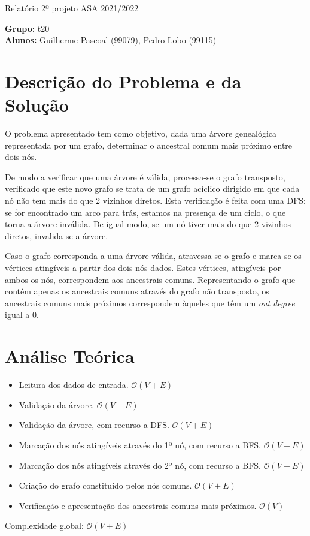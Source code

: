 \documentclass[12pt, letterpaper]{article}
\begin{document}
\begin{center}
	{\LARGE{Relatório 2º projeto ASA 2021/2022}}\\[\baselineskip]
\end{center}

\begin{flushleft}
	\textbf{Grupo:} t20\\
	\textbf{Alunos:} Guilherme Pascoal (99079), Pedro Lobo (99115)
\end{flushleft}


\section{Descrição do Problema e da Solução}

O problema apresentado tem como objetivo, dada uma árvore genealógica
representada por um grafo, determinar o ancestral comum mais próximo entre dois
nós.

De modo a verificar que uma árvore é válida, processa-se o grafo transposto,
verificado que este novo grafo se trata de um grafo acíclico dirigido em que cada
nó não tem mais do que 2 vizinhos diretos.
Esta verificação é feita com uma DFS: se for encontrado um arco para trás,
estamos na presença de um ciclo, o que torna a árvore inválida. De igual modo,
se um nó tiver mais do que 2 vizinhos diretos, invalida-se a árvore.

Caso o grafo corresponda a uma árvore válida, atravessa-se o grafo e marca-se os
vértices atingíveis a partir dos dois nós dados. Estes vértices, atingíveis por
ambos os nós, correspondem aos ancestrais comuns. Representando o grafo que
contém apenas os ancestrais comuns através do grafo não transposto, os
ancestrais comuns mais próximos correspondem àqueles que têm um
\emph{out degree} igual a 0.


\section{Análise Teórica}

\begin{itemize}
	\item Leitura dos dados de entrada. $\mathcal{O}(V + E)$
	\item Validação da árvore. $\mathcal{O}(V + E)$
	\item Validação da árvore, com recurso a DFS. $\mathcal{O}(V + E)$
	\item Marcação dos nós atingíveis através do 1º nó, com recurso a BFS. $\mathcal{O}(V + E)$
	\item Marcação dos nós atingíveis através do 2º nó, com recurso a BFS. $\mathcal{O}(V + E)$
	\item Criação do grafo constituído pelos nós comuns. $\mathcal{O}(V + E)$
	\item Verificação e apresentação dos ancestrais comuns mais próximos. $\mathcal{O}(V)$
\end{itemize}
Complexidade global: $\mathcal{O}(V + E)$
\end{document}
